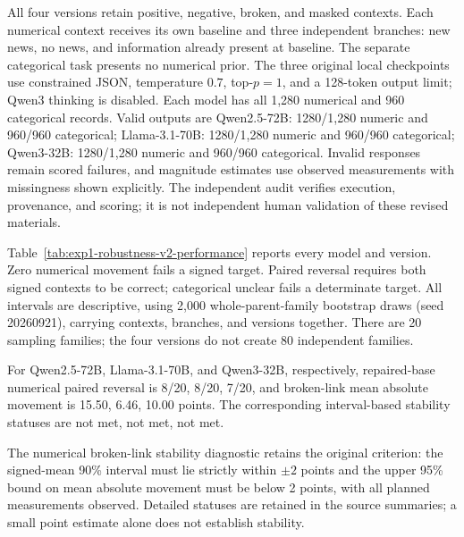 All four versions retain positive, negative, broken, and masked contexts.
Each numerical context receives its own baseline and three independent branches:
new news, no news, and information already present at baseline. The separate
categorical task presents no numerical prior. The three original local
checkpoints use constrained JSON, temperature $0.7$, top-$p=1$, and a 128-token
output limit; Qwen3 thinking is disabled. Each model has all 1,280 numerical and
960 categorical records. Valid outputs are Qwen2.5-72B: 1280/1,280 numeric and 960/960 categorical; Llama-3.1-70B: 1280/1,280 numeric and 960/960 categorical; Qwen3-32B: 1280/1,280 numeric and 960/960 categorical.
Invalid responses remain scored failures, and magnitude estimates use observed
measurements with missingness shown explicitly. The independent audit verifies
execution, provenance, and scoring; it is not independent human validation of
these revised materials.

Table~\ref{tab:exp1-robustness-v2-performance} reports every model and version.
Zero numerical movement fails a signed target. Paired reversal requires both
signed contexts to be correct; categorical unclear fails a determinate target.
All intervals are descriptive, using 2,000 whole-parent-family bootstrap draws
(seed 20260921), carrying contexts, branches, and versions together. There are
20 sampling families; the four versions do not create 80 independent families.

\begin{center}
\begin{minipage}{\linewidth}
\centering
{}
\label{tab:exp1-robustness-v2-performance}
\small
\resizebox{\linewidth}{!}{}
\end{minipage}
\end{center}

For Qwen2.5-72B, Llama-3.1-70B, and Qwen3-32B, respectively,
repaired-base numerical paired reversal is 8/20, 8/20, 7/20, and broken-link
mean absolute movement is 15.50, 6.46, 10.00 points. The corresponding
interval-based stability statuses are not met, not met, not met.

The numerical broken-link stability diagnostic retains the original criterion:
the signed-mean 90\% interval must lie strictly within $\pm2$ points and the
upper 95\% bound on mean absolute movement must be below 2 points, with all
planned measurements observed. Detailed statuses are retained in the source
summaries; a small point estimate alone does not establish stability.

